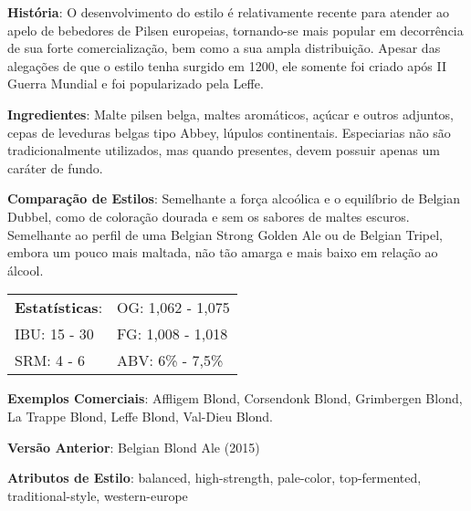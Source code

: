 \textbf{História}: O desenvolvimento do estilo é relativamente recente para atender ao apelo de bebedores de Pilsen europeias, tornando-se mais popular em decorrência de sua forte comercialização, bem como a sua ampla distribuição. Apesar das alegações de que o estilo tenha surgido em 1200, ele somente foi criado após II Guerra Mundial e foi popularizado pela Leffe.

\textbf{Ingredientes}: Malte pilsen belga, maltes aromáticos, açúcar e outros adjuntos, cepas de leveduras belgas tipo Abbey, lúpulos continentais. Especiarias não são tradicionalmente utilizados, mas quando presentes, devem possuir apenas um caráter de fundo.

\textbf{Comparação de Estilos}: Semelhante a força alcoólica e o equilíbrio de Belgian Dubbel, como de coloração dourada e sem os sabores de maltes escuros. Semelhante ao perfil de uma Belgian Strong Golden Ale ou de Belgian Tripel, embora um pouco mais maltada, não tão amarga e mais baixo em relação ao álcool.

\begin{tabular}{@{}p{35mm}p{35mm}@{}}
  \textbf{Estatísticas}: & OG: 1,062 - 1,075 \\
  IBU: 15 - 30  & FG: 1,008 - 1,018  \\
  SRM: 4 - 6  & ABV: 6\% - 7,5\%
\end{tabular}

\textbf{Exemplos Comerciais}: Affligem Blond, Corsendonk Blond, Grimbergen Blond, La Trappe Blond, Leffe Blond, Val-Dieu Blond.

\textbf{Versão Anterior}: Belgian Blond Ale (2015)

\textbf{Atributos de Estilo}: balanced, high-strength, pale-color, top-fermented, traditional-style, western-europe